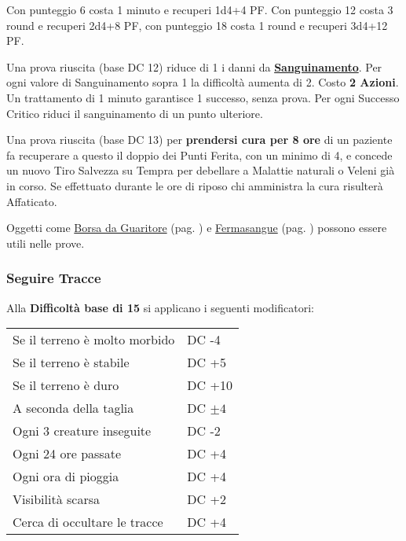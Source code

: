 \begin{multicols}{2}
Con punteggio 6 costa 1 minuto e recuperi 1d4+4 PF. Con punteggio 12 costa 3 round e recuperi 2d4+8 PF, con punteggio 18 costa 1 round e recuperi 3d4+12 PF.

Una prova riuscita (base DC 12) riduce di 1 i danni da \hyperlink{sanguinamento}{\textbf{Sanguinamento}}. Per ogni valore di Sanguinamento sopra 1 la difficoltà aumenta di 2. Costo \textbf{2 Azioni}. Un trattamento di 1 minuto garantisce 1 successo, senza prova. Per ogni Successo Critico riduci il sanguinamento di un punto ulteriore.

Una prova riuscita (base DC 13) per \textbf{prendersi cura per 8 ore} di un paziente fa recuperare a questo il doppio dei Punti Ferita, con un minimo di 4, e concede un nuovo Tiro Salvezza su Tempra per debellare a Malattie naturali o Veleni già in corso.
Se effettuato durante le ore di riposo chi amministra la cura risulterà Affaticato.

Oggetti come \hyperlink{borsadaguaritore}{Borsa da Guaritore} (pag. \pageref{borsadaguaritore}) e \hyperlink{Fermasangue}{Fermasangue} (pag. \pageref{fermasangue}) possono essere utili nelle prove.

\titlespacing*{\subsubsection}{0pt}{0.5em}{0.5em}\subsubsection*{Seguire Tracce}\label{seguiretracce}

Alla \textbf{Difficoltà base di 15} si applicano i seguenti modificatori:

\medskip

\noindent\begin{tabularx}{\linewidth}{ll}
 \rowcolor{gray!20}Se il terreno è molto morbido& DC -4\\
	Se il terreno è stabile& DC +5\\
 \rowcolor{gray!20}Se il terreno è duro& DC +10\\
	A seconda della taglia& DC $\pm4$\\
 \rowcolor{gray!20}Ogni 3 creature inseguite& DC -2\\
	Ogni 24 ore passate& DC +4\\
 \rowcolor{gray!20}Ogni ora di pioggia& DC +4\\
	Visibilità scarsa& DC +2\\
 \rowcolor{gray!20}Cerca di occultare le tracce& DC +4
\end{tabularx}


\end{multicols}

